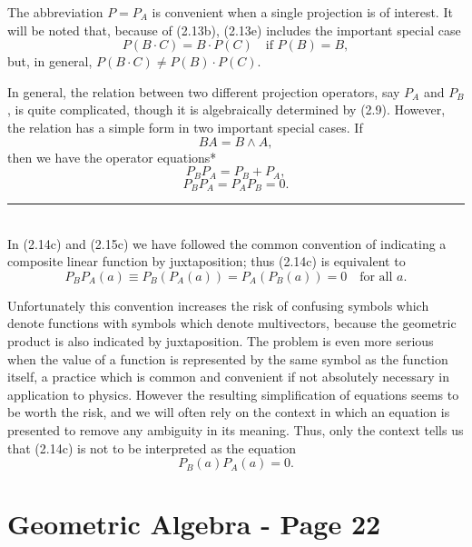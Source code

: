 \documentclass[fleqn]{scrartcl}
\numberwithin{equation}{section}
\begin{document}
\noindent The abbreviation \(P = P_A\) is convenient when a single projection is of interest. It will be noted that, because of (2.13b), (2.13e) includes the important special case
\begin{equation}
P(B \cdot C) = B \cdot P(C) \quad \text{if } P(B) = B, \tag{2.13f}
\end{equation}
but, in general, \(P(B \cdot C) \neq P(B) \cdot P(C)\).

\vspace{1em}
\noindent In general, the relation between two different projection operators, say \(P_A\) and \(P_B\), is quite complicated, though it is algebraically determined by (2.9). However, the relation has a simple form in two important special cases. If
\begin{equation}
BA = B \wedge A, \tag{2.14a}
\end{equation}
then we have the operator equations*
\begin{equation}
P_B P_A = P_B + P_A, \tag{2.14b}
\end{equation}
\begin{equation}
P_B P_A = P_A P_B = 0. \tag{2.14c}
\end{equation}

\vspace{2em}
\noindent \rule{4cm}{0.4pt} \\
\footnotesize \noindent * In (2.14c) and (2.15c) we have followed the common convention of indicating a composite linear function by juxtaposition; thus (2.14c) is equivalent to
\[
P_B P_A(a) \equiv P_B(P_A(a)) = P_A(P_B(a)) = 0 \quad \text{for all } a.
\]

\vspace{1em}
\noindent Unfortunately this convention increases the risk of confusing symbols which denote functions with symbols which denote multivectors, because the geometric product is also indicated by juxtaposition. The problem is even more serious when the value of a function is represented by the same symbol as the function itself, a practice which is common and convenient if not absolutely necessary in application to physics. However the resulting simplification of equations seems to be worth the risk, and we will often rely on the context in which an equation is presented to remove any ambiguity in its meaning. Thus, only the context tells us that (2.14c) is not to be interpreted as the equation
\[
P_B(a) P_A(a) = 0.
\]

\section*{Geometric Algebra - Page 22}
\end{document}
